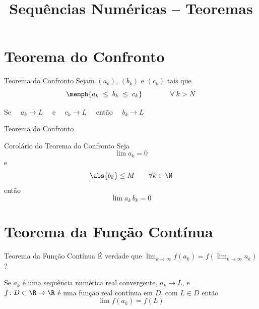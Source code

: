\documentclass[fleqn,utf8,aspectratio=169,12pt]{beamer}
\title{Sequências Numéricas -- Teoremas}
\begin{document}
\addtitle

\section{Teorema do Confronto}

\begin{frame}{Teorema do Confronto}
  Sejam $(a_k)$, $(b_k)$ e $(c_k)$ tais que
  \[
   	\memph{a_k \;\leq\; b_k \;\leq\; c_k} \qquad\qquad \forall\; k > N
 	\]

	\pause
  \vspace{\baselineskip}
  Se $\quad a_k\to L\quad$ e $\quad c_k\to L\quad$ então $\quad b_k\to L$
\end{frame}

\begin{frame}{Teorema do Confronto}
  \centering
  \scalebox{1}{}
\end{frame}

\begin{frame}{Corolário do Teorema do Confronto}
  Seja
  \[
   	\lim a_k = 0
 	\]
  \pause
   e
  \[
    \abs{b_k} \leq M
    \qquad
    \forall k \in \N
  \]
	\pause
  então
  \[
    \lim a_k \, b_k = 0
  \]
\end{frame}



\section{Teorema da Função Contínua}

\begin{frame}{Teorema da Função Contínua}
É verdade que \quad
\emph{\(
  \lim_{k\to \infty} f(a_k) = f\!\left(\lim_{k\to \infty} a_k\right)
\)} \quad?

\pause
\vspace{2\baselineskip}
Se $a_k$ é uma sequência numérica real convergente, $a_k\to L$, e\\[1mm]
$f\colon D\subset\R\to\R$ é uma função real contínua em $D$,
com $L\in D$
então
\[
  \lim f(a_k) = f(L)
\]
\end{frame}
\end{document}
